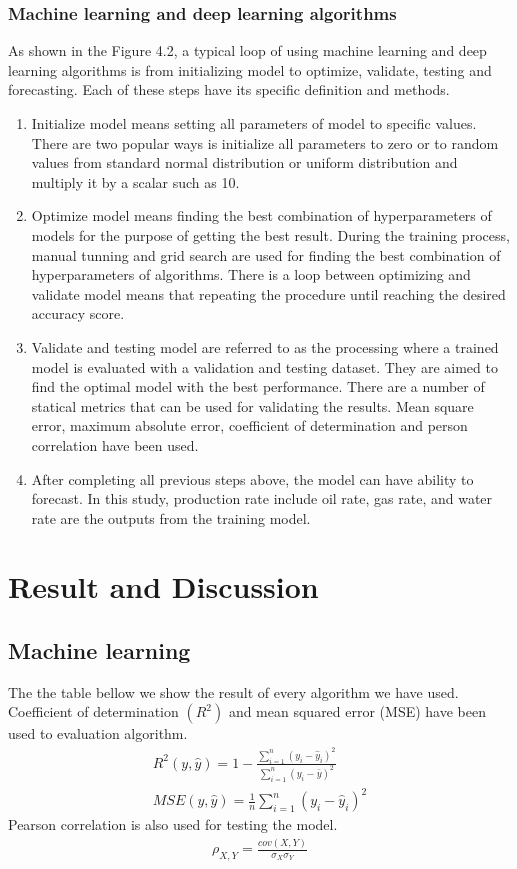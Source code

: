 \documentclass[12pt,a4paper]{report}
\begin{document}
\subsection{Machine learning and deep learning algorithms}
As shown in the Figure 4.2, a typical loop of using machine learning and deep learning algorithms is from initializing model to optimize, validate, testing and forecasting. Each of these steps have its specific definition and methods.
\begin{enumerate}
	\item Initialize model means setting all parameters of model to specific values. There are two popular ways is initialize all parameters to zero or to random values from standard normal distribution or uniform distribution and multiply it by a scalar such as 10.
	\item Optimize model means finding the best combination of hyperparameters of models for the purpose of getting the best result. During the training process, manual tunning and grid search are used for finding the best combination of hyperparameters of algorithms. There is a loop between optimizing and validate model means that repeating the procedure until reaching the desired accuracy score.
	\item Validate and testing model are referred to as the processing where a trained model is evaluated with a validation and testing dataset. They are aimed to find the optimal model with the best performance. There are a number of statical metrics that can be used for validating the results. Mean square error, maximum absolute error, coefficient of determination and person correlation have been used.
	\item After completing all previous steps above, the model can have ability to forecast. In this study, production rate include oil rate, gas rate, and water rate are the outputs from the training model.
\end{enumerate}

\chapter{Result and Discussion}
\section{Machine learning}
The the table bellow we show the result of every algorithm we have used. Coefficient of determination $(R^2)$ and mean squared error (MSE) have been used to evaluation algorithm.
\begin{align*}
R^{2}(y,\hat y) = 1 - \frac{\sum_{i = 1}^{n} (y_{i} - \hat y_{i})^2}{\sum_{i = 1}^{n} (y_{i} - \bar y)^2} \\
MSE(y,\hat y) = \frac{1}{n}\sum_{i=1}^{n}(y_{i} - \hat y_{i})^2
\end{align*}
Pearson correlation is also used for testing the model.
\begin{align*}
\rho_{X,Y} = \frac{cov(X,Y)}{\sigma_{X}\sigma_{Y}}
\end{align*}
\end{document}
